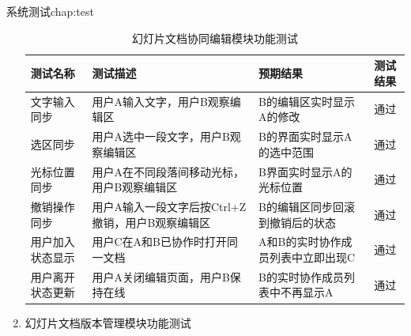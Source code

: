 \begin{cuzchapter}{系统测试}{chap:test}
\begin{enumerate}
\begin{table}[htbp]
    \caption{幻灯片文档协同编辑模块功能测试}
    \label{tab:test-collab}
    \centering
    \begin{tabular}{>{\raggedright\arraybackslash}p{2.5cm} >{\raggedright\arraybackslash}p{5.5cm} >{\raggedright\arraybackslash}p{4cm} c}
        \toprule
        测试名称 & 测试描述 & 预期结果 & 测试结果 \\
        \midrule
        文字输入同步 & 用户A输入文字，用户B观察编辑区 & B的编辑区实时显示A的修改 & 通过 \\
        \addlinespace
        选区同步   & 用户A选中一段文字，用户B观察编辑区 & B的界面实时显示A的选中范围 & 通过 \\
        \addlinespace
        光标位置同步 & 用户A在不同段落间移动光标，用户B观察编辑区 & B界面实时显示A的光标位置 & 通过 \\
        \addlinespace
        撤销操作同步   & 用户A输入一段文字后按Ctrl+Z撤销，用户B观察编辑区 & B的编辑区同步回滚到撤销后的状态 & 通过 \\
        \addlinespace
        用户加入状态显示 & 用户C在A和B已协作时打开同一文档 & A和B的实时协作成员列表中立即出现C & 通过 \\
         \addlinespace
        用户离开状态更新 & 用户A关闭编辑页面，用户B保持在线 & B的实时协作成员列表中不再显示A  & 通过 \\
        \bottomrule
    \end{tabular}
\end{table}
        \item 幻灯片文档版本管理模块功能测试
        

\end{enumerate}
\end{cuzchapter}
